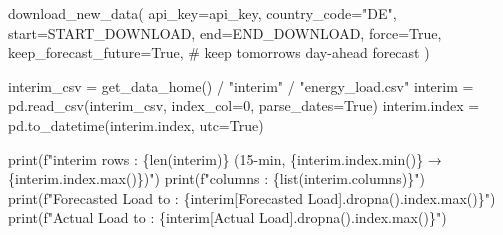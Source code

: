 \documentclass[
  english,
  letterpaper,
]{scrbook}
\newenvironment{Shaded}{\begin{snugshade}}{\end{snugshade}}
\newcommand{\BuiltInTok}[1]{\textcolor[rgb]{0.00,0.23,0.31}{#1}}
\newcommand{\CommentTok}[1]{\textcolor[rgb]{0.37,0.37,0.37}{#1}}
\newcommand{\DecValTok}[1]{\textcolor[rgb]{0.68,0.00,0.00}{#1}}
\newcommand{\NormalTok}[1]{\textcolor[rgb]{0.00,0.23,0.31}{#1}}
\newcommand{\OperatorTok}[1]{\textcolor[rgb]{0.37,0.37,0.37}{#1}}
\newcommand{\SpecialCharTok}[1]{\textcolor[rgb]{0.37,0.37,0.37}{#1}}
\newcommand{\SpecialStringTok}[1]{\textcolor[rgb]{0.13,0.47,0.30}{#1}}
\newcommand{\StringTok}[1]{\textcolor[rgb]{0.13,0.47,0.30}{#1}}
\newcommand{\VariableTok}[1]{\textcolor[rgb]{0.07,0.07,0.07}{#1}}
\begin{document}
\protect{}\label{entsoe-query}
\begin{Shaded}
\begin{Highlighting}[]
\NormalTok{download\_new\_data(}
\NormalTok{    api\_key}\OperatorTok{=}\NormalTok{api\_key,}
\NormalTok{    country\_code}\OperatorTok{=}\StringTok{"DE"}\NormalTok{,}
\NormalTok{    start}\OperatorTok{=}\NormalTok{START\_DOWNLOAD,}
\NormalTok{    end}\OperatorTok{=}\NormalTok{END\_DOWNLOAD,}
\NormalTok{    force}\OperatorTok{=}\VariableTok{True}\NormalTok{,}
\NormalTok{    keep\_forecast\_future}\OperatorTok{=}\VariableTok{True}\NormalTok{,   }\CommentTok{\# keep tomorrow\textquotesingle{}s day{-}ahead forecast}
\NormalTok{)}

\NormalTok{interim\_csv }\OperatorTok{=}\NormalTok{ get\_data\_home() }\OperatorTok{/} \StringTok{"interim"} \OperatorTok{/} \StringTok{"energy\_load.csv"}
\NormalTok{interim }\OperatorTok{=}\NormalTok{ pd.read\_csv(interim\_csv, index\_col}\OperatorTok{=}\DecValTok{0}\NormalTok{, parse\_dates}\OperatorTok{=}\VariableTok{True}\NormalTok{)}
\NormalTok{interim.index }\OperatorTok{=}\NormalTok{ pd.to\_datetime(interim.index, utc}\OperatorTok{=}\VariableTok{True}\NormalTok{)}

\BuiltInTok{print}\NormalTok{(}\SpecialStringTok{f"interim rows       : }\SpecialCharTok{\{}\BuiltInTok{len}\NormalTok{(interim)}\SpecialCharTok{\}}\SpecialStringTok{ (15{-}min, }\SpecialCharTok{\{}\NormalTok{interim}\SpecialCharTok{.}\NormalTok{index}\SpecialCharTok{.}\BuiltInTok{min}\NormalTok{()}\SpecialCharTok{\}}\SpecialStringTok{ → }\SpecialCharTok{\{}\NormalTok{interim}\SpecialCharTok{.}\NormalTok{index}\SpecialCharTok{.}\BuiltInTok{max}\NormalTok{()}\SpecialCharTok{\}}\SpecialStringTok{)"}\NormalTok{)}
\BuiltInTok{print}\NormalTok{(}\SpecialStringTok{f"columns            : }\SpecialCharTok{\{}\BuiltInTok{list}\NormalTok{(interim.columns)}\SpecialCharTok{\}}\SpecialStringTok{"}\NormalTok{)}
\BuiltInTok{print}\NormalTok{(}\SpecialStringTok{f"Forecasted Load to : }\SpecialCharTok{\{}\NormalTok{interim[}\StringTok{\textquotesingle{}Forecasted Load\textquotesingle{}}\NormalTok{]}\SpecialCharTok{.}\NormalTok{dropna()}\SpecialCharTok{.}\NormalTok{index}\SpecialCharTok{.}\BuiltInTok{max}\NormalTok{()}\SpecialCharTok{\}}\SpecialStringTok{"}\NormalTok{)}
\BuiltInTok{print}\NormalTok{(}\SpecialStringTok{f"Actual Load to     : }\SpecialCharTok{\{}\NormalTok{interim[}\StringTok{\textquotesingle{}Actual Load\textquotesingle{}}\NormalTok{]}\SpecialCharTok{.}\NormalTok{dropna()}\SpecialCharTok{.}\NormalTok{index}\SpecialCharTok{.}\BuiltInTok{max}\NormalTok{()}\SpecialCharTok{\}}\SpecialStringTok{"}\NormalTok{)}
\end{Highlighting}
\end{Shaded}
\end{document}
